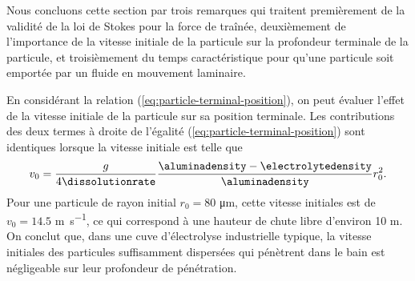 Nous concluons cette section par trois remarques qui traitent
premièrement de la validité de la loi de Stokes pour la force de traînée,
deuxièmement de l'importance de la vitesse initiale de la particule
sur la profondeur terminale de la particule, et troisièmement du temps
caractéristique pour qu'une particule soit emportée par un fluide en
mouvement laminaire.



\begin{remarque}
  En considérant la relation (\ref{eq:particle-terminal-position}), on
  peut évaluer l'effet de la vitesse initiale de la particule sur sa
  position terminale. Les contributions des deux termes à droite de
  l'égalité (\ref{eq:particle-terminal-position}) sont identiques
  lorsque la vitesse initiale est telle que
  \begin{equation*}
    v_0 = \frac{g}{4\dissolutionrate}\frac{\aluminadensity -
      \electrolytedensity}{\aluminadensity} r_0^2.
  \end{equation*}
  Pour une particule de rayon initial $r_0 = \num{80}$
  \si{\micro\meter}, cette vitesse initiales est de $v_0 = \num{14.5}$
  \si{\meter\per\second}, ce qui correspond à une hauteur de chute
  libre d'environ \num{10} \si{\meter}. On conclut que, dans une cuve
  d'électrolyse industrielle typique, la vitesse initiales des
  particules suffisamment dispersées qui pénètrent dans le bain est
  négligeable sur leur profondeur de pénétration.
\end{remarque}

